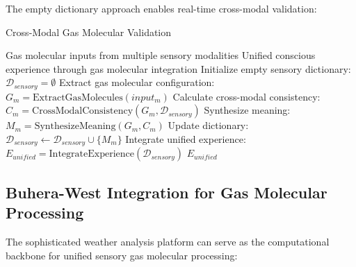 \documentclass[11pt,a4paper]{article}
\begin{document}
The empty dictionary approach enables real-time cross-modal validation:

\begin{algorithm}
\caption{Cross-Modal Gas Molecular Validation}
\begin{algorithmic}[1]
\REQUIRE Gas molecular inputs from multiple sensory modalities
\ENSURE Unified conscious experience through gas molecular integration
\STATE Initialize empty sensory dictionary: $\mathcal{D}_{sensory} = \emptyset$
    \STATE Extract gas molecular configuration: $G_m = \text{ExtractGasMolecules}(input_m)$
    \STATE Calculate cross-modal consistency: $C_m = \text{CrossModalConsistency}(G_m, \mathcal{D}_{sensory})$
    \STATE Synthesize meaning: $M_m = \text{SynthesizeMeaning}(G_m, C_m)$
    \STATE Update dictionary: $\mathcal{D}_{sensory} \leftarrow \mathcal{D}_{sensory} \cup \{M_m\}$
\ENDFOR
\STATE Integrate unified experience: $E_{unified} = \text{IntegrateExperience}(\mathcal{D}_{sensory})$
\RETURN $E_{unified}$
\end{algorithmic}
\end{algorithm}

\subsection{Buhera-West Integration for Gas Molecular Processing}

The sophisticated weather analysis platform can serve as the computational backbone for unified sensory gas molecular processing:
\end{document}
